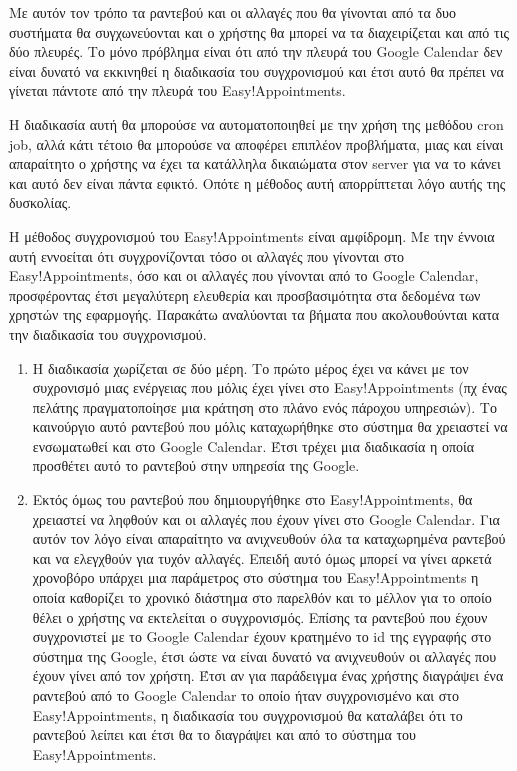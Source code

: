 Με αυτόν τον τρόπο τα ραντεβού και οι αλλαγές που θα γίνονται από τα δυο συστήματα θα συγχωνεύονται και ο χρήστης θα μπορεί να τα διαχειρίζεται και από τις δύο πλευρές. Το μόνο πρόβλημα είναι ότι από την πλευρά του Google Calendar δεν είναι δυνατό να εκκινηθεί η διαδικασία του συγχρονισμού και έτσι αυτό θα πρέπει να γίνεται πάντοτε από την πλευρά του Easy!Appointments. 

Η διαδικασία αυτή θα μπορούσε να αυτοματοποιηθεί με την χρήση της μεθόδου cron job, αλλά κάτι τέτοιο θα μπορούσε να αποφέρει επιπλέον προβλήματα, μιας και είναι απαραίτητο ο χρήστης να έχει τα κατάλληλα δικαιώματα στον server για να το κάνει και αυτό δεν είναι πάντα εφικτό. Οπότε η μέθοδος αυτή απορρίπτεται λόγο αυτής της δυσκολίας.

Η μέθοδος συγχρονισμού του Easy!Appointments είναι αμφίδρομη. Με την έννοια αυτή εννοείται ότι συγχρονίζονται τόσο οι αλλαγές που γίνονται στο Easy!Appointments, όσο και οι αλλαγές που γίνονται από το Google Calendar, προσφέροντας έτσι μεγαλύτερη ελευθερία και προσβασιμότητα στα δεδομένα των χρηστών της εφαρμογής. Παρακάτω αναλύονται τα βήματα που ακολουθούνται κατα την διαδικασία του συγχρονισμού.

\begin{enumerate}
\item Η διαδικασία χωρίζεται σε δύο μέρη. Το πρώτο μέρος έχει να κάνει με τον συχρονισμό μιας ενέργειας που μόλις έχει γίνει στο Easy!Appointments (πχ ένας πελάτης πραγματοποίησε μια κράτηση στο πλάνο ενός πάροχου υπηρεσιών). Το καινούργιο αυτό ραντεβού που μόλις καταχωρήθηκε στο σύστημα θα χρειαστεί να ενσωματωθεί και στο Google Calendar. Έτσι τρέχει μια διαδικασία η οποία προσθέτει αυτό το ραντεβού στην υπηρεσία της Google. 
\item Εκτός όμως του ραντεβού που δημιουργήθηκε στο Easy!Appointments, θα χρειαστεί να ληφθούν και οι αλλαγές που έχουν γίνει στο Google Calendar. Για αυτόν τον λόγο είναι απαραίτητο να ανιχνευθούν όλα τα καταχωρημένα ραντεβού και να ελεγχθούν για τυχόν αλλαγές. Επειδή αυτό όμως μπορεί να γίνει αρκετά χρονοβόρο υπάρχει μια παράμετρος στο σύστημα του Easy!Appointments η οποία καθορίζει το χρονικό διάστημα στο παρελθόν και το μέλλον για το οποίο θέλει ο χρήστης να εκτελείται ο συγχρονισμός. Επίσης τα ραντεβού που έχουν συγχρονιστεί με το Google Calendar έχουν κρατημένο το id της εγγραφής στο σύστημα της Google, έτσι ώστε να είναι δυνατό να ανιχνευθούν οι αλλαγές που έχουν γίνει από τον χρήστη. Έτσι αν για παράδειγμα ένας χρήστης διαγράψει ένα ραντεβού από το Google Calendar το οποίο ήταν συγχρονισμένο και στο Easy!Appointments, η διαδικασία του συγχρονισμού θα καταλάβει ότι το ραντεβού λείπει και έτσι θα το διαγράψει και από το σύστημα του Easy!Appointments.
\end{enumerate}